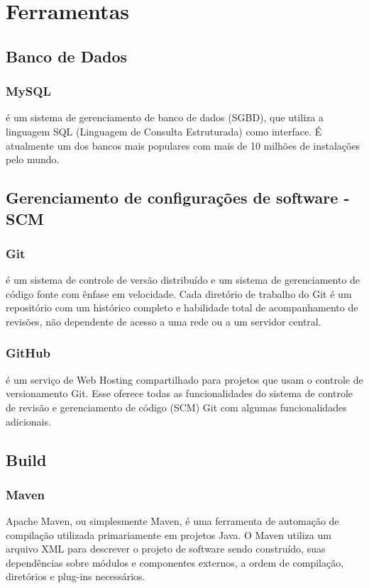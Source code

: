 \chapter{Ferramentas}

    \section{Banco de Dados}

	\subsection{MySQL} é um sistema de gerenciamento de banco de dados (SGBD), 
	que utiliza a linguagem SQL (Linguagem de Consulta Estruturada) como 
	interface. É atualmente um dos bancos mais populares com mais de 10 
	milhões de instalações pelo mundo.

    \section{Gerenciamento de configurações de software - SCM}

	\subsection{Git} é um sistema de controle de versão distribuído e um 
	sistema de gerenciamento de código fonte com ênfase em velocidade. 
	Cada diretório de trabalho do Git é um repositório com um histórico 
	completo e habilidade total de acompanhamento de revisões, não 
	dependente de acesso a uma rede ou a um servidor central.

	\subsection{GitHub} é um serviço de Web Hosting compartilhado 
	para projetos que usam o controle de versionamento Git. 
	Esse oferece todas as funcionalidades do sistema de controle de 
	revisão e gerenciamento de código (SCM) Git com algumas 
	funcionalidades adicionais.

    \section{Build}

	\subsection{Maven} Apache Maven, ou simplesmente Maven, é uma 
	ferramenta de automação de compilação utilizada primariamente 
	em projetos Java. O Maven utiliza um arquivo XML para descrever 
	o projeto de software sendo construído, suas dependências sobre 
	módulos e componentes externos, a ordem de compilação, 
	diretórios e plug-ins necessários.

